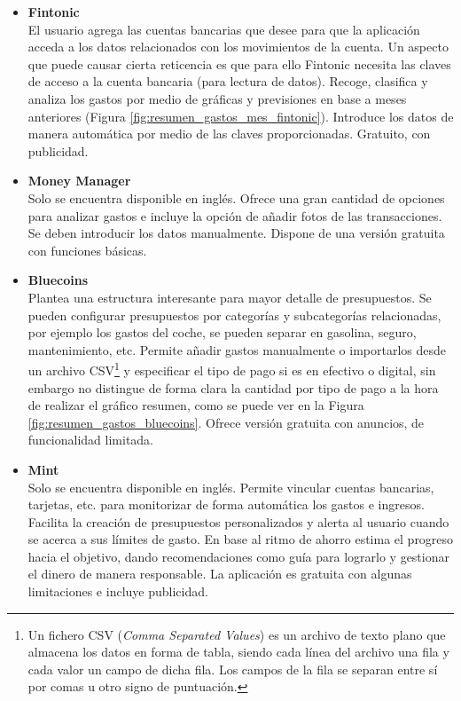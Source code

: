 \begin{itemize}
    \item \textbf{Fintonic}\cite{fintonic} \\
    El usuario agrega las cuentas bancarias que desee para que la aplicación 
    acceda a los datos relacionados con los movimientos de la cuenta. 
    Un aspecto que puede causar cierta reticencia es que para ello Fintonic necesita las claves de acceso a la cuenta bancaria (para lectura de datos).
    Recoge, clasifica y analiza los gastos por medio de gráficas y previsiones en base a meses anteriores (Figura \ref{fig:resumen_gastos_mes_fintonic}).
    Introduce los datos de manera automática por medio de las claves proporcionadas. 
    Gratuito, con publicidad.

    \item \textbf{Money Manager}\cite{realbyte} \\
    Solo se encuentra disponible en inglés. Ofrece una gran cantidad de opciones
    para analizar gastos e incluye la opción de añadir fotos de las transacciones. 
    Se deben introducir los datos manualmente. 
    Dispone de una versión gratuita con funciones básicas.

    \item \textbf{Bluecoins}\cite{bluecoins} \\
    Plantea una estructura interesante para mayor detalle de presupuestos. 
    Se pueden configurar presupuestos por categorías y subcategorías relacionadas, por ejemplo 
    los gastos del coche, se pueden separar en gasolina, seguro, mantenimiento, etc. 
    Permite añadir gastos manualmente o importarlos desde un archivo CSV\footnote{Un fichero CSV (\textit{Comma Separated Values}) es un archivo de texto plano 
    que almacena los datos en forma de tabla, siendo cada línea del archivo una fila y 
    cada valor un campo de dicha fila. Los campos de la fila se separan entre sí por comas 
    u otro signo de puntuación.} y especificar 
    el tipo de pago si es en efectivo o digital, sin embargo no distingue de forma clara la cantidad por tipo de pago a la hora de realizar el gráfico resumen, como se puede ver en la Figura \ref{fig:resumen_gastos_bluecoins}. 
    Ofrece versión gratuita con anuncios, de funcionalidad limitada.

    \item \textbf{Mint}\cite{mint} \\
    Solo se encuentra disponible en inglés. Permite vincular cuentas bancarias, tarjetas, etc. para monitorizar de forma 
    automática los gastos e ingresos. Facilita la creación de presupuestos personalizados y 
    alerta al usuario cuando se acerca a sus límites de gasto.
    En base al ritmo de ahorro estima el progreso hacia el objetivo, dando recomendaciones 
    como guía para lograrlo y gestionar el dinero de manera responsable. 
    La aplicación es gratuita con algunas limitaciones e incluye publicidad.
\end{itemize}

